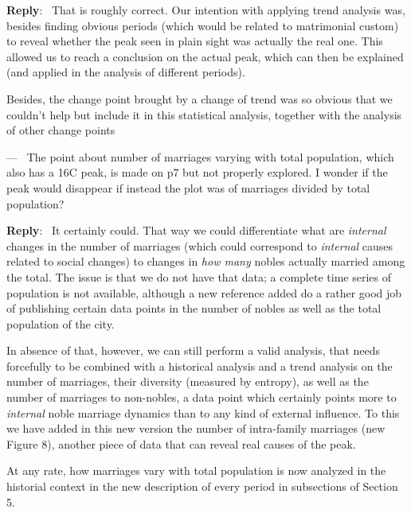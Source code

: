 \documentclass[11pt]{article}
\newcounter{reviewer}
\newcounter{point}[reviewer]
\renewcommand{\thepoint}{P\,\thereviewer.\arabic{point}}
\newenvironment{point}
   {\refstepcounter{point} \bigskip \noindent {\textbf{Reviewer~Point~\thepoint} } ---\ }
   {\par }
\newenvironment{reply}
   {\medskip \noindent \begin{sf}\textbf{Reply}:\  }
   {\medskip \end{sf}}
\begin{document}
\begin{reply}
  That is roughly correct. Our intention with applying trend analysis was,
  besides finding obvious periods (which would be related to matrimonial custom)
  to reveal whether the peak seen in plain sight was actually the real one. This
  allowed us to reach a conclusion on the actual peak, which can then be
  explained (and applied in the analysis of different periods).

  Besides, the change point brought by a change of trend was so obvious that we
  couldn't help but include it in this statistical analysis, together with the
  analysis of other change points
\end{reply}  

\begin{point}
The point about number of marriages varying with total population,
which also has a 16C peak, is made on p7 but not properly explored. I
wonder if the peak would disappear if instead the plot was of marriages
divided by total population?
\end{point}

\begin{reply}
  It certainly could. That way we could differentiate what are {\em internal}
  changes in the number of marriages (which could correspond to {\em internal}
  causes related to social changes) to changes in {\em how many} nobles actually
  married among the total. The issue is that we do not have that data;
  a complete time series of population is not available, although a new
  reference added \cite{raines2013rameau,davis1962decline} do a rather good job
  of publishing certain data points in the number of nobles as well as the total
  population of the city.

  In absence of that, however, we can still perform a valid analysis, that needs
  forcefully to be combined with a historical analysis and a trend analysis on
  the number of marriages, their diversity (measured by entropy), as well as the
  number of marriages to non-nobles, a data point which certainly points more to
  {\em internal} noble marriage dynamics than to any kind of external
  influence. To this we have added in this new version the number of
  intra-family marriages (new Figure 8), another piece of data that can reveal
  real causes of the peak.

  At any rate, how marriages vary with total population is now analyzed in the
  historial context in the new description of every period in subsections of
  Section 5.
\end{reply}
\end{document}
